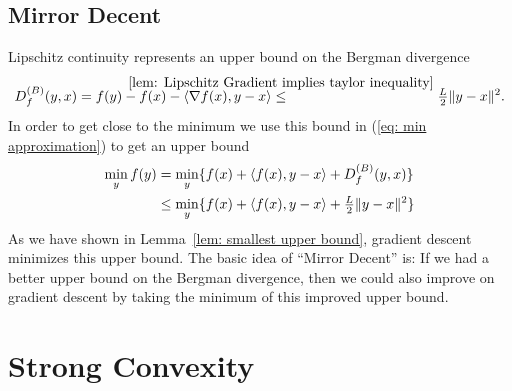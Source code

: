 \subsection{Mirror Decent}

Lipschitz continuity represents an upper bound on the Bergman divergence
\begin{align*}
	\bergmanDiv{f}(y,x)
	= f(y) - f(x) - \langle\nabla f(x), y-x\rangle
	\lxle{\ref{lem: Lipschitz Gradient implies taylor inequality}}
	\tfrac{\ubound}{2} \|y-x\|^2.
\end{align*}
In order to get close to the minimum we use this bound in
(\ref{eq: min approximation}) to get an upper bound
\begin{align*}
	\min_y f(y)
	&= \min_y \{f(x) + \langle f(x), y-x\rangle +D^{(B)}_{f}(y,x)\} \\
	&\le \min_y\{f(x) + \langle f(x), y-x\rangle +\tfrac{L}{2} \|y-x\|^2\}
\end{align*}
As we have shown in Lemma~\ref{lem: smallest upper bound}, gradient descent
minimizes this upper bound. The basic idea of ``Mirror Decent'' is: If we had a
better upper bound on the Bergman divergence, then we could also improve on
gradient descent by taking the minimum of this improved upper bound.


\section{Strong Convexity}\label{sec: Strong Convexity}

